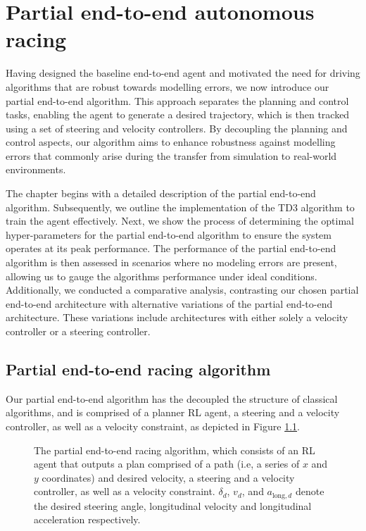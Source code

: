\chapter{Partial end-to-end autonomous racing}
\label{chp:partial_end_to_end_autonomous_racing}

Having designed the baseline end-to-end agent and motivated the need for driving algorithms that are robust towards modelling errors, we now introduce our partial end-to-end algorithm.
This approach separates the planning and control tasks, enabling the agent to generate a desired trajectory, which is then tracked using a set of steering and velocity controllers.
By decoupling the planning and control aspects, our algorithm aims to enhance robustness against modelling errors that commonly arise during the transfer from simulation to real-world environments.

The chapter begins with a detailed description of the partial end-to-end algorithm.
Subsequently, we outline the implementation of the TD3 algorithm to train the agent effectively.
Next, we show the process of determining the optimal hyper-parameters for the partial end-to-end algorithm to ensure the system operates at its peak performance. 
The performance of the partial end-to-end algorithm is then assessed in scenarios where no modeling errors are present, allowing us to gauge the algorithms performance under ideal conditions. 
Additionally, we conducted a comparative analysis, contrasting our chosen partial end-to-end architecture with alternative variations of the partial end-to-end architecture. 
These variations include architectures with either solely a velocity controller or a steering controller. 



\section{Partial end-to-end racing algorithm}

Our partial end-to-end algorithm has the decoupled the structure of classical algorithms, and is comprised of a planner RL agent, 
a steering and a velocity controller, as well as a velocity constraint, as depicted in Figure \ref{fig:steer_vel_architecture}.

\begin{figure}[htb!]
    \centering
    
    \caption[The partial end-to-end racing algorithm]{The partial end-to-end racing algorithm, which consists of an RL agent that outputs a plan comprised of a path (i.e, a series of $x$ and $y$ coordinates) and desired velocity, a steering and a velocity controller, as well as a velocity constraint. $\delta_{d}$, $v_{d}$, and $a_{\text{long},d}$ denote the desired steering angle, longitudinal velocity and longitudinal acceleration respectively.}
    \label{fig:steer_vel_architecture}
\end{figure}


